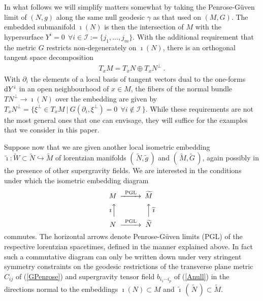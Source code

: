 \documentclass[11pt,a4paper]{article}
\def\dd{{\rm d}}
\newcommand{\beq}{\begin{eqnarray}}
\newcommand{\eeq}{\end{eqnarray}}
\begin{document}
In what follows we will simplify matters somewhat by taking the Penrose-G\"uven
limit of $(N,g)$ along the same null geodesic $\gamma$ as that used on
$(M,G)$. The embedded submanifold $\imath(N)$ is then the intersection of
$M$ with the hypersurface $Y^i=0~~\forall i\in{\mathcal
  I}:=\{j_1,\dots,j_m\}$. With the additional requirement that the metric $G$
restricts non-degenerately on $\imath(N)$, there is an orthogonal
tangent space decomposition
\beq
T_xM=T_xN\oplus T_xN^\perp \ .
\label{taudecomp}\eeq
With $\partial_i$ the elements of a local basis of tangent vectors
dual to the one-forms $\dd Y^i$ in an open neighbourhood of $x\in M$,
the fibers of the normal bundle $TN^\perp\to\imath(N)$ over the
embedding are given by $T_xN^\perp=\{\xi^\perp\in
T_xM~|~G(\partial_i,\xi^\perp)=0~~\forall i\notin{\mathcal I}\,\}$. While
these requirements are not the most general ones that one can
envisage, they will suffice for the examples that we consider in this
paper.

Suppose now that we are given another local isometric embedding
$\widetilde{\imath}:\widetilde{W}\subset\widetilde{N}\hookrightarrow
\widetilde{M}$ of lorentzian manifolds $(\,\widetilde{N},\widetilde{g}\,)$ and
$(\,\widetilde{M},\widetilde{G}\,)$, again possibly in the presence of
other supergravity fields. We are interested in the conditions under
which the isometric embedding diagram
\begin{equation}
  \begin{CD}
    M @>\text{PGL}>>                      \widetilde{M}\\
    \text{$\imath$}@AAA @AAA\text{$\widetilde{\imath}$}\\
    N @>\text{PGL}>>                      \widetilde{N}\\
  \end{CD}
\label{isomembdiag}\end{equation}
commutes. The horizontal arrows denote Penrose-G\"uven limits (PGL) of
the respective lorentzian spacetimes, defined in the manner explained
above. In fact such a commutative diagram can only be written down
under very stringent symmetry constraints on the geodesic restrictions
of the transverse plane metric $C_{ij}$ of (\ref{GPenrose}) and
supergravity tensor field $b_{i_1\cdots i_p}$ of
(\ref{Anull}) in the directions normal to the embeddings
$\imath(N)\subset M$ and
$\widetilde{\imath}\,(\,\widetilde{N}\,)\subset\widetilde{M}$.
\end{document}
